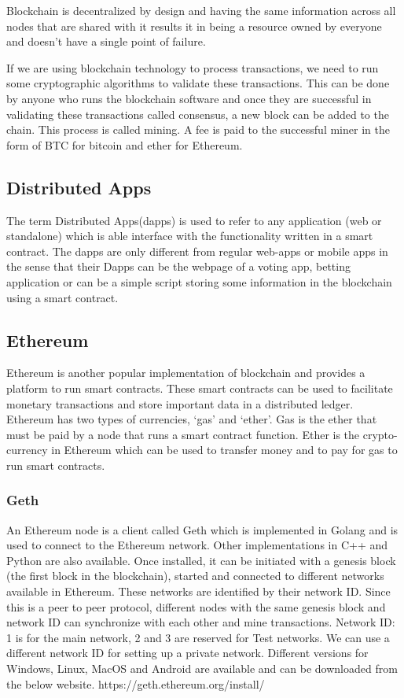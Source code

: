 \documentclass[11pt,openright]{report}
\begin{document}
Blockchain is decentralized by design and having the same information across all nodes that are shared with it results it in being a resource owned by everyone and doesn’t have a single point of failure. 

If we are using blockchain technology to process transactions, we need to run some cryptographic algorithms to validate these transactions. This can be done by anyone who runs the blockchain software and once they are successful in validating these transactions called consensus, a new block can be added to the chain. This process is called mining. A fee is paid to the successful miner in the form of BTC for bitcoin and ether for Ethereum.

\subsection{Distributed Apps}
The term Distributed Apps(dapps) is used to refer to any application (web or standalone) which is able interface with the functionality written in a smart contract. The dapps are only different from regular web-apps or mobile apps in the sense that their 
Dapps can be the webpage of a voting app, betting application or can be a simple script storing some information in the blockchain using a smart contract.

\subsection{Ethereum}
Ethereum is another popular implementation of blockchain and provides a platform to run smart contracts. These smart contracts can be used to facilitate monetary transactions and store important data in a distributed ledger. Ethereum has two types of currencies, ‘gas’ and ‘ether’. Gas is the ether that must be paid by a node that runs a smart contract function. Ether is the crypto-currency in Ethereum which can be used to transfer money and to pay for gas to run smart contracts.


\subsubsection{Geth}
An Ethereum node is a client called Geth which is implemented in Golang and is used to connect to the Ethereum network. Other implementations in C++ and Python are also available. Once installed, it can be initiated with a genesis block (the first block in the blockchain), started and connected to different networks available in Ethereum. These networks are identified by their network ID. Since this is a peer to peer protocol, different nodes with the same genesis block and network ID can synchronize with each other and mine transactions. Network ID: 1 is for the main network, 2 and 3 are reserved for Test networks. We can use a different network ID for setting up a private network. Different versions for Windows, Linux, MacOS and Android are available and can be downloaded from the below website.
https://geth.ethereum.org/install/
\end{document}
